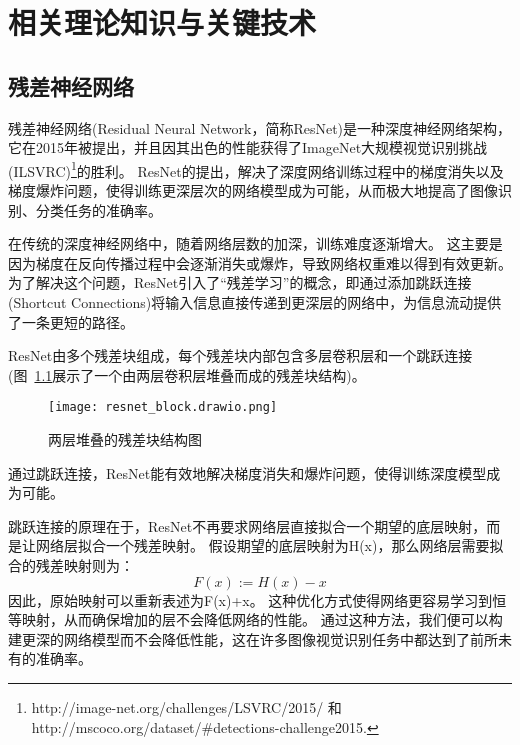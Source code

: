 \chapter{相关理论知识与关键技术}
\label{cha:basic-knowledge}

\section{残差神经网络}
残差神经网络(Residual Neural Network，简称ResNet)是一种深度神经网络架构，它在2015年被提出，并且因其出色的性能获得了ImageNet大规模视觉识别挑战(ILSVRC)\footnote{http://image-net.org/challenges/LSVRC/2015/ 和 http://mscoco.org/dataset/\#detections-challenge2015.}的胜利\cite{he2016deep}。
ResNet的提出，解决了深度网络训练过程中的梯度消失以及梯度爆炸问题，使得训练更深层次的网络模型成为可能，从而极大地提高了图像识别、分类任务的准确率。

在传统的深度神经网络中，随着网络层数的加深，训练难度逐渐增大。
这主要是因为梯度在反向传播过程中会逐渐消失或爆炸，导致网络权重难以得到有效更新。
为了解决这个问题，ResNet引入了“残差学习”的概念，即通过添加跳跃连接(Shortcut Connections)将输入信息直接传递到更深层的网络中，为信息流动提供了一条更短的路径。

ResNet由多个残差块组成，每个残差块内部包含多层卷积层和一个跳跃连接(图~\ref{fig:resnet_structure}展示了一个由两层卷积层堆叠而成的残差块结构)。
\begin{figure}[h]
  \centering
  \texttt{[image: resnet\_block.drawio.png]}
  \caption{两层堆叠的残差块结构图}
  \label{fig:resnet_structure}
\end{figure}
通过跳跃连接，ResNet能有效地解决梯度消失和爆炸问题，使得训练深度模型成为可能。


跳跃连接的原理在于，ResNet不再要求网络层直接拟合一个期望的底层映射，而是让网络层拟合一个残差映射。
假设期望的底层映射为H(x)，那么网络层需要拟合的残差映射则为：
\begin{equation}
  \label{eq:residual_mapping}
  F(x) := H(x) - x
\end{equation}
因此，原始映射可以重新表述为F(x)+x。
这种优化方式使得网络更容易学习到恒等映射，从而确保增加的层不会降低网络的性能。
通过这种方法，我们便可以构建更深的网络模型而不会降低性能，这在许多图像视觉识别任务中都达到了前所未有的准确率。


